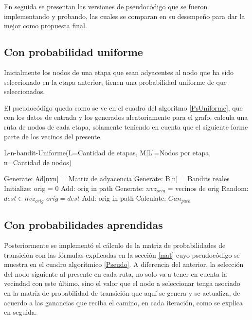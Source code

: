 
En seguida se presentan las versiones de pseudocódigo que se fueron implementando y probando, las cuales se comparan en su desempeño para dar la mejor como propuesta final.

\subsection{Con probabilidad uniforme}
Inicialmente los nodos de una etapa que sean adyacentes al nodo que ha sido seleccionado en la etapa anterior, tienen una probabilidad uniforme de que seleccionados. 

El pseudocódigo queda como se ve en el cuadro del algoritmo \ref{PsUniforme}, que con los datos de entrada y los generados aleatoriamente para el grafo, calcula una ruta de nodos de cada etapa, solamente teniendo en cuenta que el siguiente forme parte de los vecinos del presente.

\begin{algorithm} [h]
\caption{L-n-bandit-Uniforme(L=Cantidad de etapas, M[L]=Nodos por etapa, n=Cantidad de nodos)} \label{PsUniforme}
\begin{algorithmic}[1]
\STATE Generate: Ad[nxn] = Matriz de adyacencia
\STATE Generate: B[n] = Bandits reales
     \STATE Initialize: orig = 0
     \STATE Add: orig in path
        \STATE Generate: $nvz_{orig}$ = vecinos de orig
        \STATE Random: ${dest \in nvz_{orig}}$
        \STATE $orig = dest$
        \STATE Add: orig in path
     \ENDFOR
     \STATE Calculate: $Gan_{path}$
\ENDFOR
\end{algorithmic}
\end{algorithm}


\subsection{Con probabilidades aprendidas}
Posteriormente se implementó el cálculo de la matriz de probabilidades de transición con las fórmulas explicadas en la sección \ref{mat} cuyo pseudocódigo se muestra en el cuadro algorítmico \ref{Pseudo}. A diferencia del anterior, la selección del nodo siguiente al presente en cada ruta, no solo va a tener en cuenta la vecindad con este último, sino el valor que el nodo a seleccionar tenga asociado en la matriz de probabilidad de transición que aquí se genera y se actualiza, de acuerdo a las ganancias que reciba el camino, en cada iteración, como se explica en seguida.

